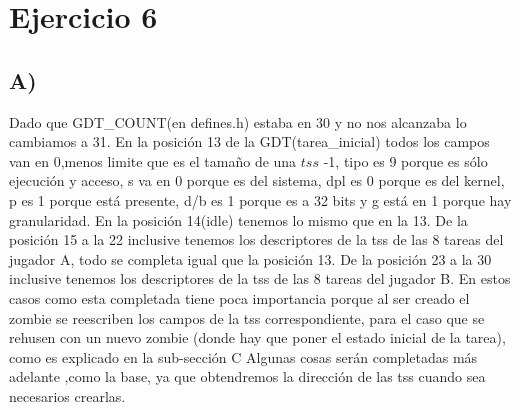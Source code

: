
\section{Ejercicio 6}
\subsection*{A)}
Dado que GDT\_COUNT(en defines.h) estaba en 30 y no nos alcanzaba lo cambiamos a 31.\newline
En la posici\'on 13 de la GDT(tarea\_inicial) todos los campos van en 0,menos limite que es el tamaño de una $tss$ -1, tipo es 9 porque es s\'olo ejecuci\'on y acceso, s va en 0 porque es 
del sistema, dpl es 0 porque es del kernel, p es 1 porque est\'a presente, d/b es 1 porque es a 32 bits y g est\'a en 1 porque hay granularidad.\newline
En la posici\'on 14(idle) tenemos lo mismo que en la 13.\newline
De la posici\'on 15 a la 22 inclusive tenemos los descriptores de la tss de las 8 tareas del jugador A, todo se completa igual que la posici\'on 13. De la posici\'on 23 a la 30 
inclusive tenemos los descriptores de la tss de las 8 tareas del jugador B. En estos casos como esta completada tiene poca importancia porque al ser creado el zombie se 
reescriben los campos de la tss correspondiente, para el caso que se rehusen con un nuevo zombie (donde hay que poner el estado inicial de la tarea), como es explicado en la sub-secci\'on C\newline
Algunas cosas ser\'an completadas m\'as adelante ,como la base, ya que obtendremos la direcci\'on de las tss cuando sea necesarios crearlas.\newline
\newpage
